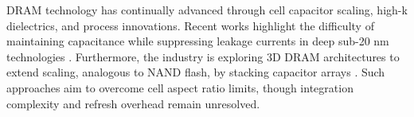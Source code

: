 DRAM technology has continually advanced through cell capacitor scaling, high-k dielectrics, and process innovations. 
Recent works highlight the difficulty of maintaining capacitance while suppressing leakage currents in deep sub-20 nm technologies \cite{choi2022}.
Furthermore, the industry is exploring 3D DRAM architectures to extend scaling, analogous to NAND flash, by stacking capacitor arrays \cite{kim2021_dram}.
Such approaches aim to overcome cell aspect ratio limits, though integration complexity and refresh overhead remain unresolved.
